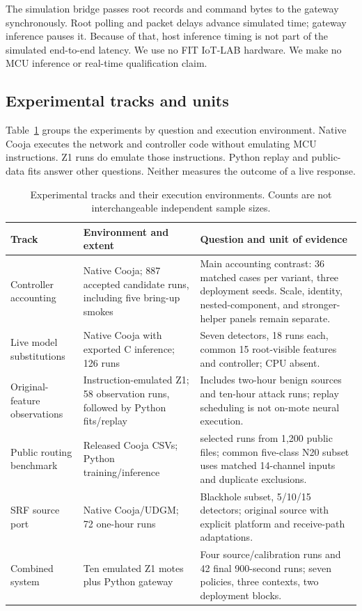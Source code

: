 \documentclass[journal]{IEEEtran}
\begin{document}
The simulation bridge passes root records and command bytes to the gateway synchronously. Root polling and packet delays advance simulated time; gateway inference pauses it. Because of that, host inference timing is not part of the simulated end-to-end latency. We use no FIT IoT-LAB hardware. We make no MCU inference or real-time qualification claim.

\subsection{Experimental tracks and units}\label{sec:tracks}
Table~\ref{tab:tracks} groups the experiments by question and execution environment. Native Cooja executes the network and controller code without emulating MCU instructions. Z1 runs do emulate those instructions. Python replay and public-data fits answer other questions. Neither measures the outcome of a live response.

\begin{table}[t]
\caption{Experimental tracks and their execution environments. Counts are not interchangeable independent sample sizes.}
\label{tab:tracks}\centering\small
\begin{tabularx}{\textwidth}{>{\raggedright\arraybackslash}p{2.5cm}>{\raggedright\arraybackslash}p{3.2cm}>{\raggedright\arraybackslash}X}
\toprule Track & Environment and extent & Question and unit of evidence \\
\midrule
Controller accounting & Native Cooja; 887 accepted candidate runs, including five bring-up smokes & Main accounting contrast: 36 matched cases per variant, three deployment seeds. Scale, identity, nested-component, and stronger-helper panels remain separate. \\
Live model substitutions & Native Cooja with exported C inference; 126 runs & Seven detectors, 18 runs each, common 15 root-visible features and controller; CPU absent. \\
Original-feature observations & Instruction-emulated Z1; 58 observation runs, followed by Python fits/replay & Includes two-hour benign sources and ten-hour attack runs; replay scheduling is not on-mote neural execution. \\
Public routing benchmark & Released Cooja CSVs; Python training/inference & 960 selected runs from 1,200 public files; common five-class N20 subset uses matched 14-channel inputs and duplicate exclusions. \\
SRF source port & Native Cooja/UDGM; 72 one-hour runs & Blackhole subset, 5/10/15 detectors; original source with explicit platform and receive-path adaptations. \\
Combined system & Ten emulated Z1 motes plus Python gateway & Four source/calibration runs and 42 final 900-second runs; seven policies, three contexts, two deployment blocks. \\
\bottomrule
\end{tabularx}
\end{table}
\end{document}
